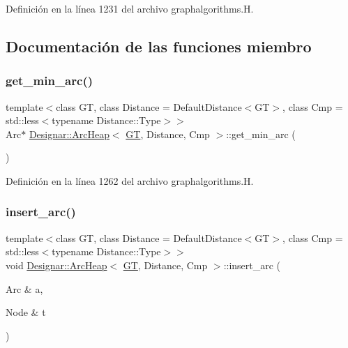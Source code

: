 Definición en la línea 1231 del archivo graphalgorithms.\+H.



\subsection{Documentación de las funciones miembro}
\mbox{\label{class_designar_1_1_arc_heap_aa97981f64e6a7868d4d8b310bfd6b1cb}} 
\subsubsection{\texorpdfstring{get\+\_\+min\+\_\+arc()}{get\_min\_arc()}}
{\footnotesize\ttfamily template$<$class GT, class Distance = Default\+Distance$<$\+G\+T$>$, class Cmp = std\+::less$<$typename Distance\+::\+Type$>$$>$ \\
Arc$\ast$ \hyperlink{class_designar_1_1_arc_heap}{Designar\+::\+Arc\+Heap}$<$ \hyperlink{demo-buildgraph_8_c_a3001c40d2c31ca87ed96cd7d1334a55e}{GT}, Distance, Cmp $>$\+::get\+\_\+min\+\_\+arc (\begin{DoxyParamCaption}{ }\end{DoxyParamCaption})\hspace{0.3cm}{\ttfamily [inline]}}



Definición en la línea 1262 del archivo graphalgorithms.\+H.

\mbox{\label{class_designar_1_1_arc_heap_a578a5310c000e671cb967799317f534d}} 
\subsubsection{\texorpdfstring{insert\+\_\+arc()}{insert\_arc()}}
{\footnotesize\ttfamily template$<$class GT, class Distance = Default\+Distance$<$\+G\+T$>$, class Cmp = std\+::less$<$typename Distance\+::\+Type$>$$>$ \\
void \hyperlink{class_designar_1_1_arc_heap}{Designar\+::\+Arc\+Heap}$<$ \hyperlink{demo-buildgraph_8_c_a3001c40d2c31ca87ed96cd7d1334a55e}{GT}, Distance, Cmp $>$\+::insert\+\_\+arc (\begin{DoxyParamCaption}\item[{Arc \&}]{a,  }\item[{Node \&}]{t }\end{DoxyParamCaption})\hspace{0.3cm}{\ttfamily [inline]}}



